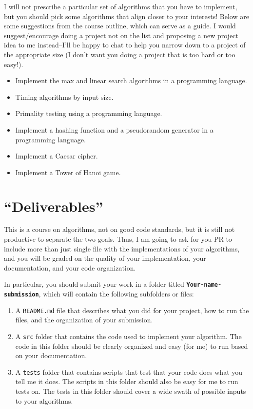 \documentclass{article}
\begin{document}
I will not prescribe a particular set of algorithms that you have to implement, but you should pick some algorithms that align closer to your interests!
Below are some suggestions from the course outline, which can serve as a guide.
I would suggest/encourage doing a project not on the list and proposing a new project idea to me instead--I'll be happy to chat to help you narrow down to a project of the appropriate size (I don't want you doing a project that is too hard or too easy!).

\begin{itemize}
	\item Implement the max and linear search algorithms in a programming language.
	\item Timing algorithms by input size.
	\item Primality testing using a programming language.
	\item Implement a hashing function and a pseudorandom generator in a programming language.
	\item Implement a Caesar cipher.
	\item Implement a Tower of Hanoi game.
\end{itemize}

\section{``Deliverables''}
This is a course on algorithms, not on good code standards, but it is still not productive to separate the two goals.
Thus, I am going to ask for you PR to include more than just single file with the implementations of your algorithms, and you will be graded on the quality of your implementation, your documentation, and your code organization.

In particular, you should submit your work in a folder titled \texttt{\textbf{Your-name-submission}}, which will contain the following subfolders or files:
\begin{enumerate}
	\item A \texttt{README.md} file that describes what you did for your project, how to run the files, and the organization of your submission.
	\item A \texttt{src} folder that contains the code used to implement your algorithm. The code in this folder should be clearly organized and easy (for me) to run based on your documentation.
	\item A \texttt{tests} folder that contains scripts that test that your code does what you tell me it does. The scripts in this folder should also be easy for me to run tests on. The tests in this folder should cover a wide swath of possible inputs to your algorithms.
\end{enumerate}
\end{document}

